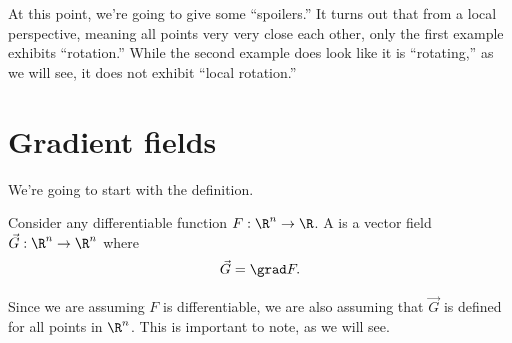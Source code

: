 \documentclass{ximera}
\begin{document}
At this point, we're going to give some ``spoilers.'' It turns out
that from a local perspective, meaning all points very very close each
other, only the first example exhibits ``rotation.'' While the second
example does look like it is ``rotating,'' as we will see, it does not
exhibit ``local rotation.''


\section{Gradient fields}

We're going to start with the definition.

\begin{definition}
  Consider any differentiable function $F:\R^n\to \R$.
  A  is a vector field $\vec{G}:\R^n\to \R^n$ where
  \[
  \vec{G} = \grad F.
  \]
\end{definition}

Since we are assuming $F$ is differentiable, we are also assuming that
$\vec{G}$ is defined for all points in $\R^n$. This is important to
note, as we will see.
\end{document}
